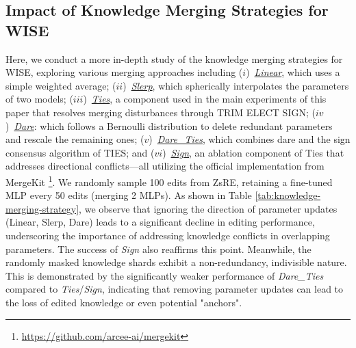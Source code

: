 \documentclass{article}
\begin{document}
\subsection{Impact of Knowledge Merging Strategies for WISE} \label{app_sec:varying_merge}
\begin{table}
    \centering
    \caption{\small Varying Merging Strategy. ZsRE. \texttt{LLaMA-2-7B}.}
    \vspace{-10pt}
    \label{tab:knowledge-merging-strategy}
\end{table}

Here, we conduct a more in-depth study of the knowledge merging strategies for WISE, exploring various merging approaches including ($i$)~\underline{\textit{Linear}}, which uses a simple weighted average;
($ii$)~\underline{\textit{Slerp}}, which spherically interpolates the parameters of two models;
($iii$)~\underline{\textit{Ties}}, a component used in the main experiments of this paper that resolves merging disturbances through TRIM ELECT SIGN;
($iv$)~\underline{\textit{Dare}}: which follows a Bernoulli distribution to delete redundant parameters and rescale the remaining ones;
($v$)~\underline{\textit{Dare\_Ties}}, which combines dare and the sign consensus algorithm of TIES;
and ($vi$)~\underline{\textit{Sign}}, an ablation component of Ties that addresses directional conflicts—all utilizing the official implementation from MergeKit \cite{mergekit} \footnote{\url{https://github.com/arcee-ai/mergekit}}.
We randomly sample 100 edits from ZsRE, retaining a fine-tuned MLP every 50 edits (merging 2 MLPs).
As shown in Table \ref{tab:knowledge-merging-strategy}, we observe that ignoring the direction of parameter updates (Linear, Slerp, Dare) leads to a significant decline in editing performance, underscoring the importance of addressing knowledge conflicts in overlapping parameters.
The success of \textit{Sign} also reaffirms this point.
Meanwhile, the randomly masked knowledge shards exhibit a non-redundancy, indivisible nature.
This is demonstrated by the significantly weaker performance of \textit{Dare\_Ties} compared to \textit{Ties}/\textit{Sign}, indicating that removing parameter updates can lead to the loss of edited knowledge or even potential "anchors".
\end{document}
